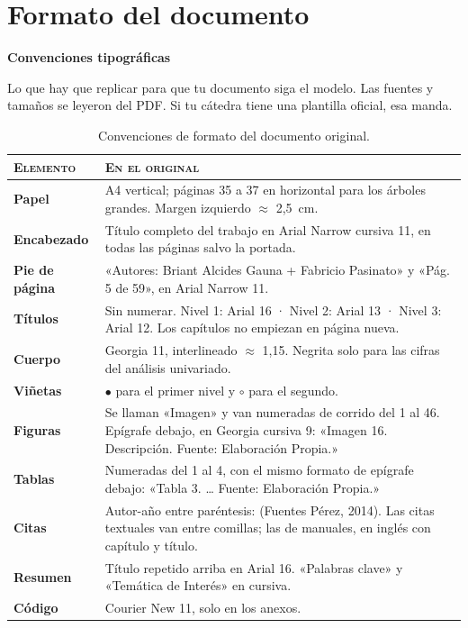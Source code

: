 \documentclass[12pt,a4paper,oneside]{report}
\newcommand{\meta}[2]{%
  \par\noindent{\small\sffamily\color{gris}#1}\hspace{1.2em}%
  {\small\sffamily\bfseries\color{acento}#2}\par\smallskip}
\begin{document}
\chapter{Formato del documento}
\label{cap:formato}
\meta{Medido sobre el PDF}{Convenciones tipográficas}

Lo que hay que replicar para que tu documento siga el modelo. Las fuentes y tamaños se
leyeron del PDF. Si tu cátedra tiene una plantilla oficial, esa manda.

\begin{table}[h]
\centering
\small
\renewcommand{\arraystretch}{1.25}
\begin{tabularx}{\linewidth}{@{}>{\bfseries}l X@{}}
\toprule
\normalfont\textsc{Elemento} & \textsc{En el original} \\
\midrule
Papel & A4 vertical; páginas 35 a 37 en horizontal para los árboles grandes. Margen
izquierdo $\approx$ 2,5~cm. \\
Encabezado & Título completo del trabajo en Arial Narrow cursiva 11, en todas las
páginas salvo la portada. \\
Pie de página & «Autores: Briant Alcides Gauna + Fabricio Pasinato» y «Pág. 5 de 59»,
en Arial Narrow 11. \\
Títulos & Sin numerar. Nivel 1: Arial 16 · Nivel 2: Arial 13 · Nivel 3: Arial 12. Los
capítulos no empiezan en página nueva. \\
Cuerpo & Georgia 11, interlineado $\approx$ 1,15. Negrita solo para las cifras del
análisis univariado. \\
Viñetas & $\bullet$ para el primer nivel y $\circ$ para el segundo. \\
Figuras & Se llaman «Imagen» y van numeradas de corrido del 1 al 46. Epígrafe debajo,
en Georgia cursiva 9: «Imagen 16. Descripción. Fuente: Elaboración Propia.» \\
Tablas & Numeradas del 1 al 4, con el mismo formato de epígrafe debajo: «Tabla 3. …
Fuente: Elaboración Propia.» \\
Citas & Autor-año entre paréntesis: (Fuentes Pérez, 2014). Las citas textuales van
entre comillas; las de manuales, en inglés con capítulo y título. \\
Resumen & Título repetido arriba en Arial 16. «Palabras clave» y «Temática de Interés»
en cursiva. \\
Código & Courier New 11, solo en los anexos. \\
\bottomrule
\end{tabularx}
\caption{Convenciones de formato del documento original.}
\label{tab:formato}
\end{table}
\end{document}
